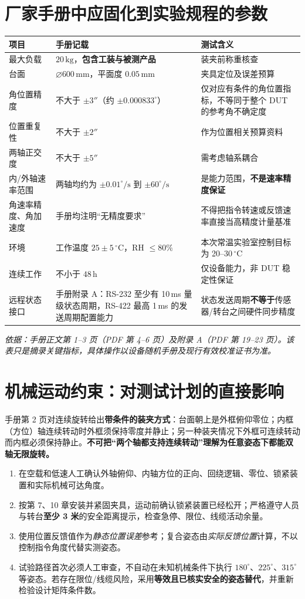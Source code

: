 \section{厂家手册中应固化到实验规程的参数}
\begin{longtable}{p{51mm}p{63mm}p{34mm}}
\toprule
项目 & 手册记载 & 测试含义\\\midrule\endhead
最大负载 & $20\,\mathrm{kg}$，\textbf{包含工装与被测产品} & 装夹前称重核查\\
台面 & $\varnothing600\,\mathrm{mm}$，平面度 $0.05\,\mathrm{mm}$ & 夹具定位及误差预算\\
角位置精度 & 不大于 $\pm3''$（约 $\pm0.000833^\circ$） & 仅对应有条件的角位置指标，不等同于整个 DUT 的参考角不确定度\\
位置重复性 & 不大于 $\pm2''$ & 作为位置相关预算资料\\
两轴正交度 & 不大于 $\pm5''$ & 需考虑轴系耦合\\
内/外轴速率范围 & 两轴均约为 $\pm0.01^\circ/\mathrm{s}$ 到 $\pm60^\circ/\mathrm{s}$ & 是能力范围，\textbf{不是速率精度保证}\\
角速率精度、角加速度 & 手册均注明“无精度要求” & 不得把指令转速或反馈速率直接当高精度计量基准\\
环境 & 工作温度 $25\pm5\,{}^\circ\mathrm{C}$，RH $\le80\%$ & 本次常温实验室控制目标为 20--30\,{}$^\circ$C\\
连续工作 & 不小于 $48\,\mathrm{h}$ & 仅设备能力，非 DUT 稳定性保证\\
远程状态接口 & 手册附录 A：RS-232 至少有 10\,ms 量级状态周期，RS-422 最高 1\,ms 的发送周期配置能力 & 状态发送周期\textbf{不等于}传感器/转台之间硬件同步精度\\\bottomrule
\end{longtable}
\noindent\textit{依据：手册正文第 1--3 页（PDF 第 4--6 页）及附录 A（PDF 第 19--23 页）。该表只是摘录关键指标，具体操作以设备随机手册及现行有效校准证书为准。}
\section{机械运动约束：对测试计划的直接影响}
\begin{warningbox}
手册第 2 页对连续旋转给出\textbf{带条件的装夹方式}：台面朝上是外框俯仰零位；内框（方位）轴连续转动时外框须保持零度并静止；另一种装夹情况下外框可连续转动而内框必须保持静止。\textbf{不可把“两个轴都支持连续转动”理解为任意姿态下都能双轴无限旋转。}
\end{warningbox}
\begin{enumerate}
\item 在空载和低速人工确认外轴俯仰、内轴方位的正向、回绕逻辑、零位、锁紧装置和实际机械可达角度。
\item 按第 7、10 章安装并紧固夹具，运动前确认锁紧装置已经松开；严格遵守人员与转台\textbf{至少 3 米}的安全距离提示，检查急停、限位、线缆活动余量。
\item 使用位置反馈值作为\emph{静态位置误差}参考；复合姿态由\emph{实际反馈位置}计算，不以控制指令角度代替实测姿态。
\item 试验路径首次必须人工审查，不自动在未知机械条件下执行 $180^\circ$、$225^\circ$、$315^\circ$ 等姿态。若存在限位/线缆风险，采用\textbf{等效且已核实安全的姿态替代}，并重新检验设计矩阵条件数。
\end{enumerate}
